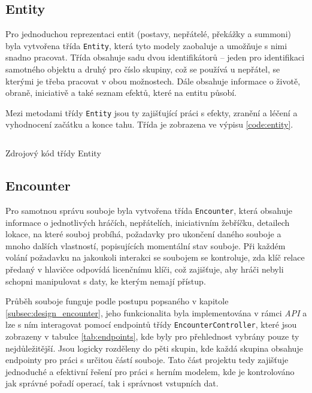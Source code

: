 \subsection{Entity}
\label{subsec:impl_entity}

Pro jednoduchou reprezentaci entit (postavy, nepřátelé, překážky a summoni) byla vytvořena třída \texttt{Entity}, která tyto modely zaobaluje a umožňuje s nimi snadno pracovat. Třída obsahuje sadu dvou identifikátorů -- jeden pro identifikaci samotného objektu a druhý pro číslo skupiny, což se používá u nepřátel, se kterými je třeba pracovat v obou možnostech. Dále obsahuje informace o životě, obraně, iniciativě a také seznam efektů, které na entitu působí.

Mezi metodami třídy \texttt{Entity} jsou ty zajišťující práci s efekty, zranění a léčení a vyhodnocení začátku a konce tahu. Třída je zobrazena ve výpisu \ref{code:entity}.

\begin{listing}[H]
    \inputminted{Java}{code/EncounterEntity.java}
    \caption{Zdrojový kód třídy Entity}
    \label{code:entity}
\end{listing}


\subsection{Encounter}
\label{subsec:impl_encounter}

Pro samotnou správu souboje byla vytvořena třída \texttt{Encounter}, která obsahuje informace o jednotlivých hráčích, nepřátelích, iniciativním žebříčku, detailech lokace, na které souboj probíhá, požadavky pro ukončení daného souboje a mnoho dalších vlastností, popisujících momentální stav souboje. Při každém volání požadavku na jakoukoli interakci se soubojem se kontroluje, zda klíč relace předaný v hlavičce odpovídá licenčnímu klíči, což zajišťuje, aby hráči nebyli schopni manipulovat s daty, ke kterým nemají přístup. 

Průběh souboje funguje podle postupu popsaného v kapitole \ref{subsec:design_encounter}, jeho funkcionalita byla implementována v rámci \textit{API} a lze s ním interagovat pomocí endpointů třídy \texttt{EncounterController}, které jsou zobrazeny v tabulce \ref{tab:endpoints}, kde byly pro přehlednost vybrány pouze ty nejdůležitější. Jsou logicky rozděleny do pěti skupin, kde každá skupina obsahuje endpointy pro práci s určitou částí souboje. Tato část projektu tedy zajišťuje jednoduché a efektivní řešení pro práci s herním modelem, kde je kontrolováno jak správné pořadí operací, tak i správnost vstupních dat.

